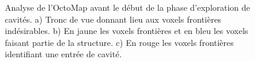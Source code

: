 \begin{figure}[!h]
  \centering
  \hfil
  \hfil
  \caption[Recherche de voxel frontières dans une OctoMap]{
    Analyse de l'OctoMap avant le début de la phase d'exploration de cavités.
    a) Tronc de vue donnant lieu aux voxels frontières indésirables.
    b) En jaune les voxels frontières et en bleu les voxels faisant partie de la structure.
    c) En rouge les voxels frontières identifiant une entrée de cavité.
  }
  \label{fig:ugv_frontier}
\end{figure}

